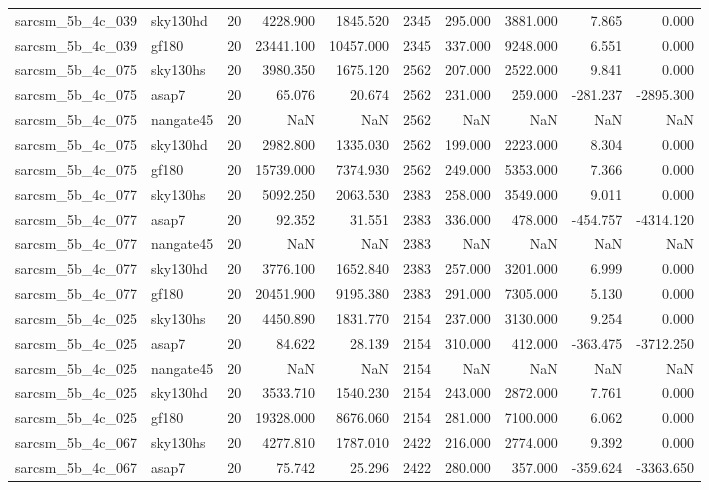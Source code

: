 \begin{tabular}{llrrrrrrrr}
sarcsm\_5b\_4c\_039 & sky130hd & 20 & 4228.900 & 1845.520 & 2345 & 295.000 & 3881.000 & 7.865 & 0.000 \\
sarcsm\_5b\_4c\_039 & gf180 & 20 & 23441.100 & 10457.000 & 2345 & 337.000 & 9248.000 & 6.551 & 0.000 \\
sarcsm\_5b\_4c\_075 & sky130hs & 20 & 3980.350 & 1675.120 & 2562 & 207.000 & 2522.000 & 9.841 & 0.000 \\
sarcsm\_5b\_4c\_075 & asap7 & 20 & 65.076 & 20.674 & 2562 & 231.000 & 259.000 & -281.237 & -2895.300 \\
sarcsm\_5b\_4c\_075 & nangate45 & 20 & NaN & NaN & 2562 & NaN & NaN & NaN & NaN \\
sarcsm\_5b\_4c\_075 & sky130hd & 20 & 2982.800 & 1335.030 & 2562 & 199.000 & 2223.000 & 8.304 & 0.000 \\
sarcsm\_5b\_4c\_075 & gf180 & 20 & 15739.000 & 7374.930 & 2562 & 249.000 & 5353.000 & 7.366 & 0.000 \\
sarcsm\_5b\_4c\_077 & sky130hs & 20 & 5092.250 & 2063.530 & 2383 & 258.000 & 3549.000 & 9.011 & 0.000 \\
sarcsm\_5b\_4c\_077 & asap7 & 20 & 92.352 & 31.551 & 2383 & 336.000 & 478.000 & -454.757 & -4314.120 \\
sarcsm\_5b\_4c\_077 & nangate45 & 20 & NaN & NaN & 2383 & NaN & NaN & NaN & NaN \\
sarcsm\_5b\_4c\_077 & sky130hd & 20 & 3776.100 & 1652.840 & 2383 & 257.000 & 3201.000 & 6.999 & 0.000 \\
sarcsm\_5b\_4c\_077 & gf180 & 20 & 20451.900 & 9195.380 & 2383 & 291.000 & 7305.000 & 5.130 & 0.000 \\
sarcsm\_5b\_4c\_025 & sky130hs & 20 & 4450.890 & 1831.770 & 2154 & 237.000 & 3130.000 & 9.254 & 0.000 \\
sarcsm\_5b\_4c\_025 & asap7 & 20 & 84.622 & 28.139 & 2154 & 310.000 & 412.000 & -363.475 & -3712.250 \\
sarcsm\_5b\_4c\_025 & nangate45 & 20 & NaN & NaN & 2154 & NaN & NaN & NaN & NaN \\
sarcsm\_5b\_4c\_025 & sky130hd & 20 & 3533.710 & 1540.230 & 2154 & 243.000 & 2872.000 & 7.761 & 0.000 \\
sarcsm\_5b\_4c\_025 & gf180 & 20 & 19328.000 & 8676.060 & 2154 & 281.000 & 7100.000 & 6.062 & 0.000 \\
sarcsm\_5b\_4c\_067 & sky130hs & 20 & 4277.810 & 1787.010 & 2422 & 216.000 & 2774.000 & 9.392 & 0.000 \\
sarcsm\_5b\_4c\_067 & asap7 & 20 & 75.742 & 25.296 & 2422 & 280.000 & 357.000 & -359.624 & -3363.650 \\

\end{tabular}

